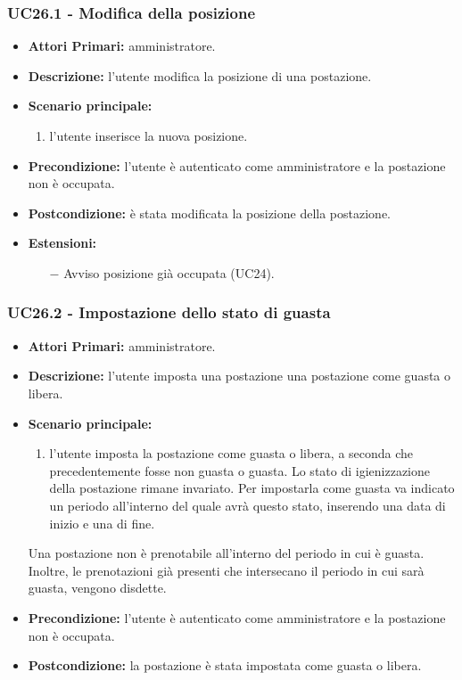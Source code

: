 \subsubsection{ UC26.1 - Modifica della posizione}
\begin{itemize}
	\item\textbf{Attori Primari:}
	amministratore.
	\item\textbf{Descrizione:}
	l'utente modifica la posizione di una postazione.
	\item\textbf{Scenario principale:} 
	\begin{enumerate}
		\item l'utente inserisce la nuova posizione.
	\end{enumerate}
	\item\textbf{Precondizione:} 
	l'utente è autenticato come amministratore e la postazione non è occupata.
	\item\textbf{Postcondizione:}
	è stata modificata la posizione della postazione.
	\item\textbf{Estensioni:}
	\begin{itemize}
		\item[$-$] Avviso posizione già occupata (UC24).
	\end{itemize}
\end{itemize}

\subsubsection{ UC26.2 - Impostazione dello stato di guasta}
\begin{itemize}
	\item\textbf{Attori Primari:}
	amministratore.
	\item\textbf{Descrizione:}
	l'utente imposta una postazione una postazione come guasta o libera.
	\item\textbf{Scenario principale:} 
	\begin{enumerate}
		\item l'utente imposta la postazione come guasta o libera, a seconda che precedentemente fosse non guasta o guasta. Lo stato di igienizzazione della postazione rimane invariato. Per impostarla come guasta va indicato un periodo all'interno del quale avrà questo stato, inserendo una data di inizio e una di fine.
	\end{enumerate}
	Una postazione non è prenotabile all'interno del periodo in cui è guasta. Inoltre, le prenotazioni già presenti che intersecano il periodo in cui sarà guasta, vengono disdette.
	\item\textbf{Precondizione:} 
	l'utente è autenticato come amministratore e la postazione non è occupata.
	\item\textbf{Postcondizione:}
	la postazione è stata impostata come guasta o libera.
\end{itemize}


